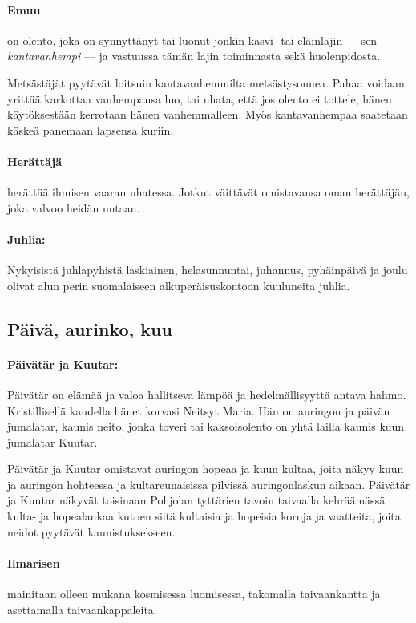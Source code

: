   \paragraph{Emuu} on olento, joka on synnyttänyt tai luonut jonkin kasvi- tai eläinlajin ---
    sen \emph{kantavanhempi} --- ja vastuussa tämän lajin toiminnasta sekä huolenpidosta.
    \par
    Metsästäjät pyytävät loitsuin kantavanhemmilta metsästysonnea. Pahaa voidaan yrittää karkottaa
    vanhempansa luo, tai uhata, että jos olento ei tottele, hänen käytöksestään kerrotaan hänen
    vanhemmalleen. Myös kantavanhempaa saatetaan käskeä panemaan lapsensa kuriin.
  \paragraph{Herättäjä} herättää ihmisen vaaran uhatessa. Jotkut väittävät omistavansa oman
    herättäjän, joka valvoo heidän untaan.
  \paragraph{Juhlia:} Nykyisistä juhlapyhistä laskiainen, helasunnuntai, juhannus, pyhäinpäivä ja 
    joulu olivat alun perin suomalaiseen alkuperäisuskontoon kuuluneita juhlia.


\subsection{Päivä, aurinko, kuu}

  \paragraph{Päivätär ja Kuutar:} Päivätär on elämää ja valoa hallitseva lämpöä ja hedelmällisyyttä
    antava hahmo. Kristillisellä kaudella hänet korvasi Neitsyt Maria. Hän on auringon ja päivän
    jumalatar, kaunis neito, jonka toveri tai kaksois\-olento on yhtä lailla kaunis kuun jumalatar
    Kuutar.
    \par
    Päivätär ja Kuutar omistavat auringon hopeaa ja kuun kultaa, joita näkyy kuun ja auringon
    hohteessa ja kultareunaisissa pilvissä auringonlaskun aikaan. Päivätär ja Kuutar näkyvät
    toisinaan Pohjolan tyttärien tavoin taivaalla kehräämässä kulta- ja hopealankaa kutoen
    siitä kultaisia ja hopeisia koruja ja vaatteita, joita neidot pyytävät kaunistuksekseen.

  \paragraph{Ilmarisen} mainitaan olleen mukana kosmisessa luomisessa, takomalla taivaankantta
    ja asettamalla taivaankappaleita.


